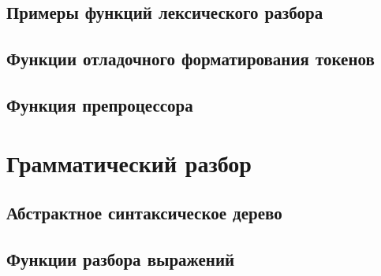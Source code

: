 \subsection*{Примеры функций лексического разбора}


\subsection*{Функции отладочного форматирования токенов}



\subsection*{Функция препроцессора}



\section*{Грамматический разбор}
\subsection*{Абстрактное синтаксическое дерево}


\subsection*{Функции разбора выражений}


% 

% 


